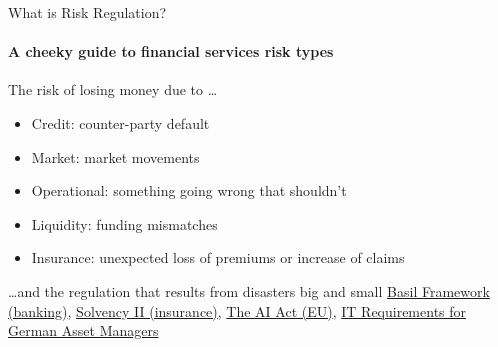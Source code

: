 \begin{frame}{What is Risk Regulation?}
  \framesubtitle{A cheeky guide to financial services risk types}
  \begin{block}{The risk of losing money due to \ldots}
    \begin{itemize}
      \item Credit: counter-party default
      \item Market: market movements
      \item Operational: something going wrong that shouldn't
      \item Liquidity: funding mismatches
      \item Insurance: unexpected loss of premiums or increase of claims
    \end{itemize}
  \end{block}

  \begin{block}{\ldots and the regulation that results from disasters big and small}
    \href{https://www.bis.org/basel_framework/}{Basil Framework (banking)},
    \href{https://www.eiopa.europa.eu/browse/solvency-2_en}{Solvency II (insurance)},
    \href{https://eur-lex.europa.eu/legal-content/EN/TXT/PDF/?uri=CELEX\%3A52021PC0206}{The AI Act (EU)},
    \href{https://www.bafin.de/SharedDocs/Veroeffentlichungen/EN/Meldung/2020/meldung\_2020\_05\_25\_KAIT\_en.html}{IT Requirements for German Asset Managers}
  \end{block}
\end{frame}


